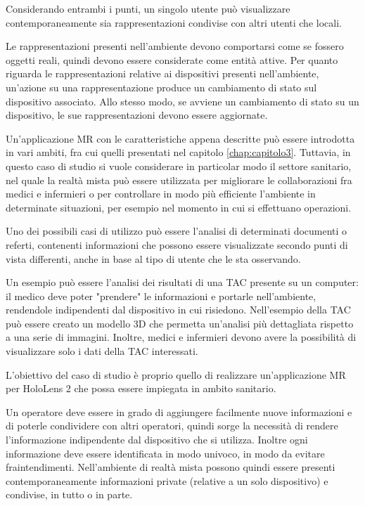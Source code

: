 Considerando entrambi i punti, un singolo utente può visualizzare contemporaneamente sia rappresentazioni condivise con altri utenti che locali.

Le rappresentazioni presenti nell'ambiente devono comportarsi come se fossero oggetti reali, quindi devono essere considerate come entità attive.
Per quanto riguarda le rappresentazioni relative ai dispositivi presenti nell'ambiente, un'azione su una rappresentazione produce un cambiamento di stato sul dispositivo associato.
Allo stesso modo, se avviene un cambiamento di stato su un dispositivo, le sue rappresentazioni devono essere aggiornate.

Un'applicazione MR con le caratteristiche appena descritte può essere introdotta in vari ambiti, fra cui quelli presentati nel capitolo \ref{chap:capitolo3}.
Tuttavia, in questo caso di studio si vuole considerare in particolar modo il settore sanitario, nel quale la realtà mista può essere utilizzata per migliorare le collaborazioni fra medici e infermieri o per controllare in modo più efficiente l'ambiente in determinate situazioni, per esempio nel momento in cui si effettuano operazioni.

Uno dei possibili casi di utilizzo può essere l'analisi di determinati documenti o referti, contenenti informazioni che possono essere visualizzate secondo punti di vista differenti, anche in base al tipo di utente che le sta osservando. 

Un esempio può essere l'analisi dei risultati di una TAC presente su un computer: il medico deve poter "prendere" le informazioni e portarle nell'ambiente, rendendole indipendenti dal dispositivo in cui risiedono. Nell'esempio della TAC può essere creato un modello 3D che permetta un'analisi più dettagliata rispetto a una serie di immagini.
Inoltre, medici e infermieri devono avere la possibilità di visualizzare solo i dati della TAC interessati.

L'obiettivo del caso di studio è proprio quello di realizzare un'applicazione MR per HoloLens 2 che possa essere impiegata in ambito sanitario.

Un operatore deve essere in grado di aggiungere facilmente nuove informazioni e di poterle condividere con altri operatori, quindi sorge la necessità di rendere l'informazione indipendente dal dispositivo che si utilizza. Inoltre ogni informazione deve essere identificata in modo univoco, in modo da evitare fraintendimenti.
Nell'ambiente di realtà mista possono quindi essere presenti contemporaneamente informazioni private (relative a un solo dispositivo) e condivise, in tutto o in parte.

